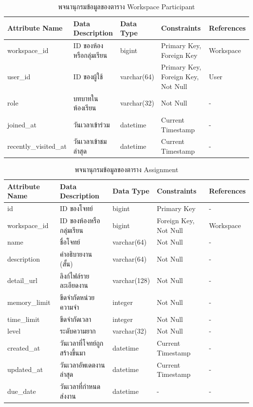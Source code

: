 \documentclass[12pt,one side,openright,a4paper]{cpe-thesis-th}
\begin{document}
    \begin{table}[H]
        \centering
        \caption{พจนานุกรมข้อมูลของตาราง Workspace Participant}
        \label{tbl:data-dict-workspace_participants}
        \begin{tabular}{p{2.5cm}|p{3.5cm}p{2cm}p{3cm}p{2cm}} \hline\hline
            Attribute Name & Data Description & Data Type & Constraints & References \\ \hline\hline
            workspace\_id & ID ของห้องหรือกลุ่มเรียน & bigint & Primary Key, Foreign Key & Workspace \\
            user\_id & ID ของผู้ใช้ & varchar(64) & Primary Key, Foreign Key, Not Null & User \\
            role & บทบาทในห้องเรียน & varchar(32) & Not Null & - \\
            joined\_at & วันเวลาเข้าร่วม & datetime & Current Timestamp & - \\
            recently\_visited\_at & วันเวลาเข้าชมล่าสุด & datetime & Current Timestamp & - \\ \hline\hline
        \end{tabular}   
    \end{table}
    \begin{table}[H]
        \centering
        \caption{พจนานุกรมข้อมูลของตาราง Assignment}\label{tbl:data-dict-assignment}
        \begin{tabular}{p{2cm}|p{4cm}p{2cm}p{3cm}p{2cm}} \hline\hline
            Attribute Name & Data Description & Data Type & Constraints & References \\ \hline\hline
            id & ID ของโจทย์ & bigint & Primary Key & - \\
            workspace\_id & ID ของห้องหรือกลุ่มเรียน & bigint & Foreign Key, Not Null & Workspace \\
            name & ชื่อโจทย์ & varchar(64) & Not Null & - \\
            description & คำอธิบายงาน (สั้น) & varchar(64) & Not Null & - \\
            detail\_url & ลิงก์ไฟล์รายละเอียดงาน & varchar(128) & Not Null & - \\
            memory\_limit & ขีดจำกัดหน่วยความจำ & integer & Not Null & - \\
            time\_limit & ขีดจำกัดเวลา & integer & Not Null & - \\
            level & ระดับความยาก & varchar(32) & Not Null & - \\
            created\_at & วันเวลาที่โจทย์ถูกสร้างขึ้นมา & datetime & Current Timestamp & - \\
            updated\_at & วันเวลาอัพเดตงานล่าสุด & datetime & Current Timestamp & - \\ 
            due\_date & วันเวลาที่กำหนดส่งงาน & datetime & - & - \\ \hline\hline
        \end{tabular}   
    \end{table}
\end{document}

